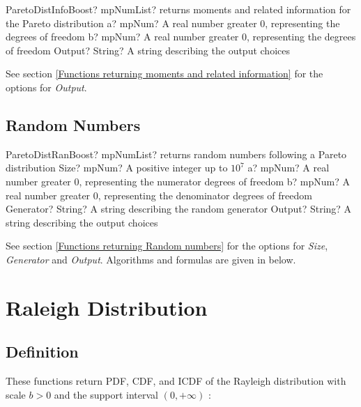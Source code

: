 \begin{mpFunctionsExtract}
	\mpFunctionThree
	{ParetoDistInfoBoost? mpNumList? returns moments and related information for the Pareto distribution}
	{a? mpNum? A real number greater 0, representing the degrees of freedom}
	{b? mpNum? A real number greater 0, representing the degrees of freedom}
	{Output? String? A string describing the output choices}
\end{mpFunctionsExtract}

\vspace{0.3cm}

See section \ref{Functions returning moments and related information} for the options for {\itshape\sffamily Output}. 



\subsection{Random Numbers}

\begin{mpFunctionsExtract}
	\mpFunctionFive
	{ParetoDistRanBoost? mpNumList? returns random numbers following a Pareto distribution}
	{Size? mpNum? A positive integer up to $10^7$}
	{a? mpNum? A real number greater 0, representing the numerator  degrees of freedom}
	{b? mpNum? A real number greater 0, representing the denominator degrees of freedom}
	{Generator? String? A string describing the random generator}
	{Output? String? A string describing the output choices}
\end{mpFunctionsExtract}

\vspace{0.3cm}

See section \ref{Functions returning Random numbers} for the options for  {\itshape\sffamily Size},  {\itshape\sffamily Generator} and {\itshape\sffamily Output}. Algorithms and formulas are given in below.





\section{Raleigh Distribution}
\label{RaleighDistribution}

\subsection{Definition}
These functions return PDF, CDF, and ICDF of the Rayleigh distribution with scale
$b > 0$ and the support interval $(0,+\infty)$ :


